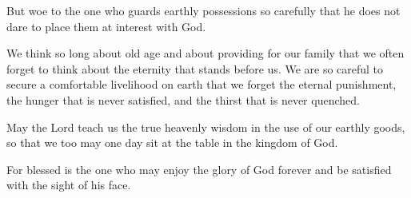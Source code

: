 But woe to the one who guards earthly possessions so carefully that he does not dare to place them at interest with God.

We think so long about old age and about providing for our family that we often forget to think about the eternity that stands before us. We are so careful to secure a comfortable livelihood on earth that we forget the eternal punishment, the hunger that is never satisfied, and the thirst that is never quenched.

May the Lord teach us the true heavenly wisdom in the use of our earthly goods, so that we too may one day sit at the table in the kingdom of God.

For blessed is the one who may enjoy the glory of God forever and be satisfied with the sight of his face.
